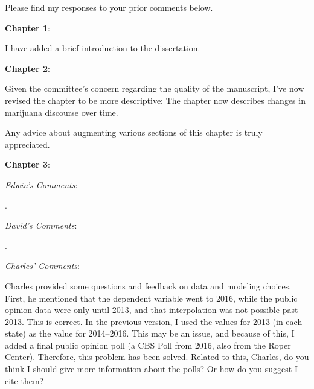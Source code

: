 \documentclass[12pt,stdletter,dateno,sigleft]{newlfm} %
\begin{document}
\begin{newlfm}


Please find my responses to your prior comments below. \newline%


\textbf{Chapter 1}:

I have added a brief introduction to the dissertation. \newline 


\textbf{Chapter 2}: 

Given the committee's concern regarding the quality of the manuscript, I've now revised the chapter to be more descriptive: The chapter now describes changes in marijuana discourse over time. 

Any advice about augmenting various sections of this chapter is truly appreciated. \newline




\textbf{Chapter 3}: 

\textit{Edwin's Comments}:

.\newline


\textit{David's Comments}:

.\newline


\textit{Charles' Comments}:

Charles provided some questions and feedback on data and modeling choices. First, he mentioned that the dependent variable went to 2016, while the public opinion data were only until 2013, and that interpolation was not possible past 2013. This is correct. In the previous version, I used the values for 2013 (in each state) as the value for 2014--2016. This may be an issue, and because of this, I added a final public opinion poll (a CBS Poll from 2016, also from the Roper Center). Therefore, this problem has been solved. Related to this, Charles, do you think I should give more information about the polls? Or how do you suggest I cite them? 


\end{newlfm}
\end{document}
